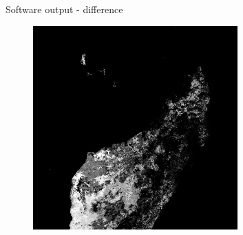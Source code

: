 \documentclass[9pt]{beamer}
\begin{document}
\begin{frame}{Software output - difference}

	\begin{figure}
		\centering
		\includegraphics[width=0.7\textwidth]{pic/diff.png}
	\end{figure}
\end{frame}
\end{document}
